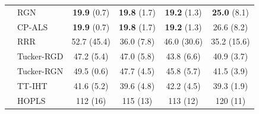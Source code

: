 \begin{table}[!htbp]
{\begin{tabular}{llcccc}
 & RGN & \textbf{19.9} (0.7) & \textbf{19.8} (1.7) & \textbf{19.2} (1.3) & \textbf{25.0} (8.1) \\
 & CP-ALS & \textbf{19.9} (0.7) & \textbf{19.8} (1.7) & \textbf{19.2} (1.3) & 26.6 (8.2) \\
 & RRR & 52.7 (45.4) & 36.0 (7.8) & 46.0 (30.6) & 35.2 (15.6) \\
 & Tucker-RGD & 47.2 (5.4) & 47.0 (5.8) & 43.8 (6.6) & 40.9 (3.7) \\
 & Tucker-RGN & 49.5 (0.6) & 47.7 (4.5) & 45.8 (5.7) & 41.5 (3.9) \\
 & TT-IHT & 41.6 (5.2) & 39.6 (4.8) & 42.2 (4.5) & 39.3 (1.9) \\
 & HOPLS & 112 (16) & 115 (13) & 113 (12) & 120 (11) \\
\bottomrule
\end{tabular}}
\end{table}
